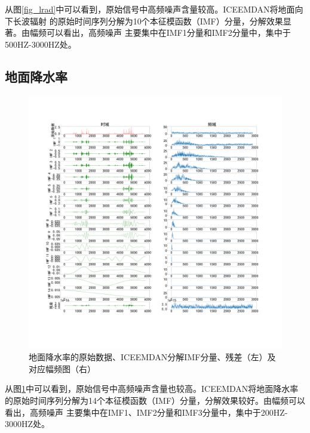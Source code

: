 \documentclass[AutoFakeBold]{LZUThesis}
\begin{document}
从图\ref{fig_lrad}中可以看到，原始信号中高频噪声含量较高。ICEEMDAN将地面向下长波辐射
的原始时间序列分解为10个本征模函数（IMF）分量，分解效果显著。由幅频可以看出，高频噪声
主要集中在IMF1分量和IMF2分量中，集中于500HZ-3000HZ处。

\subsection{地面降水率}
\begin{figure}[H]
	\centering
    \includegraphics[width=1\textwidth]{figures/prec.pdf}
    \caption{地面降水率的原始数据、ICEEMDAN分解IMF分量、残差（左）及对应幅频图（右）}
    \label{fig_prec}
\end{figure}

从图\ref{fig_prec}中可以看到，原始信号中高频噪声含量也较高。ICEEMDAN将地面降水率
的原始时间序列分解为14个本征模函数（IMF）分量，分解效果较好。由幅频可以看出，高频噪声
主要集中在IMF1、IMF2分量和IMF3分量中，集中于200HZ-3000HZ处。
\end{document}
